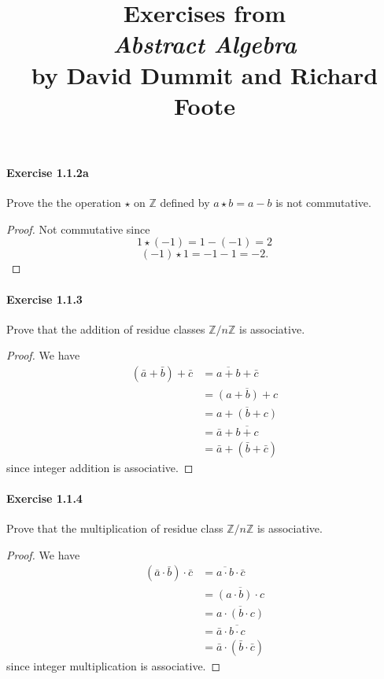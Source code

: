 \documentclass{article}
\title{\textbf{
Exercises from \\
\textit{Abstract Algebra} \\
by David Dummit and Richard Foote
}}
\date{}
\theoremstyle{definition}
\begin{document}
\maketitle

\paragraph{Exercise 1.1.2a} Prove the the operation $\star$ on $\mathbb{Z}$ defined by $a\star b=a-b$ is not commutative.
\begin{proof}
    Not commutative since
$$
1 \star(-1)=1-(-1)=2
$$
$$
(-1) \star 1=-1-1=-2 .
$$
\end{proof}


\paragraph{Exercise 1.1.3} Prove that the addition of residue classes $\mathbb{Z}/n\mathbb{Z}$ is associative.
\begin{proof}
    We have
$$
\begin{aligned}
(\bar{a}+\bar{b})+\bar{c} &=\overline{a+b}+\bar{c} \\
&=\overline{(a+b)+c} \\
&=\overline{a+(b+c)} \\
&=\bar{a}+\overline{b+c} \\
&=\bar{a}+(\bar{b}+\bar{c})
\end{aligned}
$$
since integer addition is associative.
\end{proof}


\paragraph{Exercise 1.1.4} Prove that the multiplication of residue class $\mathbb{Z}/n\mathbb{Z}$ is associative.
\begin{proof}
    We have
$$
\begin{aligned}
(\bar{a} \cdot \bar{b}) \cdot \bar{c} &=\overline{a \cdot b} \cdot \bar{c} \\
&=\overline{(a \cdot b) \cdot c} \\
&=\overline{a \cdot(b \cdot c)} \\
&=\bar{a} \cdot \overline{b \cdot c} \\
&=\bar{a} \cdot(\bar{b} \cdot \bar{c})
\end{aligned}
$$
since integer multiplication is associative.
\end{proof}
\end{document}
